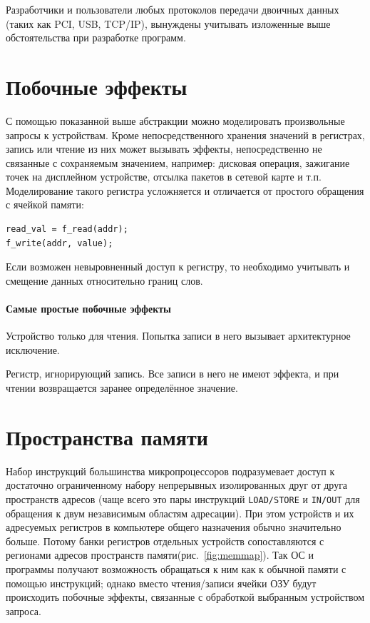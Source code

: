 Разработчики и пользователи любых протоколов передачи двоичных данных (таких как PCI, USB, TCP/IP), вынуждены учитывать изложенные выше обстоятельства при разработке программ.

\section{Побочные эффекты}

С помощью показанной выше абстракции можно моделировать произвольные запросы к устройствам. Кроме непосредственного хранения значений в регистрах, запись или чтение из них может вызывать эффекты, непосредственно не связанные с сохраняемым значением, например: дисковая операция, зажигание точек на дисплейном устройстве, отсылка пакетов в сетевой карте и т.п. Моделирование такого регистра усложняется и отличается от простого обращения с ячейкой памяти:
\begin{lstlisting}
read_val = f_read(addr);
f_write(addr, value);    
\end{lstlisting}

Если возможен невыровненный доступ к регистру, то необходимо учитывать и смещение данных относительно границ слов. 

\paragraph{Самые простые побочные эффекты}
\begin{enumerate*}
\item Устройство только для чтения. Попытка записи в него вызывает архитектурное исключение.
\item Регистр, игнорирующий запись. Все записи в него не имеют эффекта, и при чтении возвращается заранее определённое значение.
\end{enumerate*}

\section{Пространства памяти}

Набор инструкций большинства микропроцессоров подразумевает доступ к достаточно ограниченному набору  непрерывных изолированных друг от друга пространств адресов  (чаще всего это пары инструкций \texttt{LOAD/STORE} и  \texttt{IN/OUT} для обращения к двум независимым областям адресации). При этом устройств и их адресуемых  регистров в компьютере общего назначения обычно значительно больше. Потому банки регистров отдельных устройств сопоставляются с регионами адресов пространств памяти(рис.~\ref{fig:memmap}). Так ОС и программы получают возможность обращаться к ним как к обычной памяти с помощью инструкций; однако вместо чтения/записи ячейки ОЗУ будут происходить побочные эффекты, связанные с обработкой выбранным устройством запроса.

